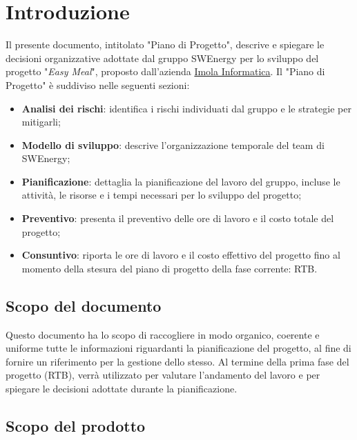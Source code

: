 \section{Introduzione}

Il presente documento, intitolato "Piano di Progetto", descrive e spiegare le
decisioni organizzative adottate dal gruppo SWEnergy per lo sviluppo del
progetto "\textit{Easy Meal}", proposto dall'azienda
\href{https://imolainformatica.it/}{Imola Informatica}. Il "Piano di Progetto" è
suddiviso nelle seguenti sezioni:

\begin{itemize}
	\item \textbf{Analisi dei rischi}: identifica i rischi individuati dal
	      gruppo e le strategie per mitigarli;

	\item \textbf{Modello di sviluppo}: descrive l'organizzazione temporale del
	      team di SWEnergy;

	\item \textbf{Pianificazione}: dettaglia la pianificazione del lavoro del
	      gruppo, incluse le attività, le risorse e i tempi necessari per lo
	      sviluppo del progetto;

	\item \textbf{Preventivo}: presenta il preventivo delle ore di lavoro e il
	      costo totale del progetto;

	\item \textbf{Consuntivo}: riporta le ore di lavoro e il costo effettivo del
	      progetto fino al momento della stesura del piano di progetto della
	      fase corrente: RTB.
\end{itemize}

\subsection{Scopo del documento}

Questo documento ha lo scopo di raccogliere in modo organico, coerente e
uniforme tutte le informazioni riguardanti la pianificazione del progetto, al
fine di fornire un riferimento per la gestione dello stesso. Al termine della
prima fase del progetto (RTB), verrà utilizzato per valutare l'andamento del
lavoro e per spiegare le decisioni adottate durante la pianificazione.

\subsection{Scopo del prodotto}

